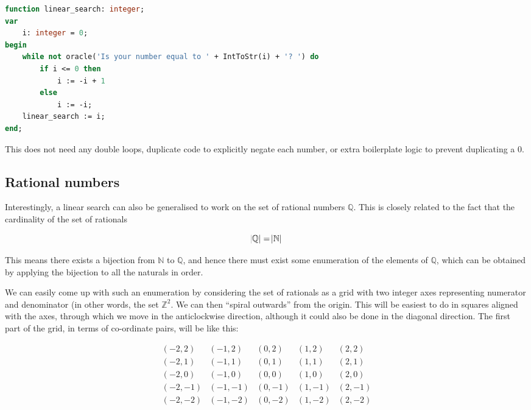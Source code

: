 \documentclass{article}
\begin{document}
\begin{lstlisting}[language=Pascal, caption=Linear search on $\mathbb{Z}$ implementation]
function linear_search: integer;
var
    i: integer = 0;
begin
    while not oracle('Is your number equal to ' + IntToStr(i) + '? ') do
        if i <= 0 then
            i := -i + 1
        else
            i := -i;
    linear_search := i;
end;
\end{lstlisting}

    This does not need any double loops, duplicate code to explicitly negate
    each number, or extra boilerplate logic to prevent duplicating a 0.

    \subsection{Rational numbers}

    Interestingly, a linear search can also be generalised to work on the set
    of rational numbers $\mathbb{Q}$. This is closely related to the fact that
    the cardinality of the set of rationals

    \begin{equation}
    \abs{\mathbb{Q}} = \abs{\mathbb{N}}
    \end{equation}

    This means there exists a bijection from $\mathbb{N}$ to $\mathbb{Q}$, and
    hence there must exist some enumeration of the elements of $\mathbb{Q}$,
    which can be obtained by applying the bijection to all the naturals in
    order.
    
    We can easily come up with such an enumeration by considering the set of
    rationals as a grid with two integer axes representing numerator and
    denominator (in other words, the set $\mathbb{Z}^2$. We can then ``spiral
    outwards'' from the origin. This will be easiest to do in squares aligned
    with the axes, through which we move in the anticlockwise direction,
    although it could also be done in the diagonal direction.  The first part
    of the grid, in terms of co-ordinate pairs, will be like this:

    \begin{equation}
    \begin{matrix}
    (-2, 2) & (-1, 2) & (0, 2) & (1, 2) & (2, 2)\\
    (-2, 1) & (-1, 1) & (0, 1) & (1, 1) & (2, 1)\\
    (-2, 0) & (-1, 0) & (0, 0) & (1, 0) & (2, 0)\\
    (-2, -1) & (-1, -1) & (0, -1) & (1, -1) & (2, -1)\\
    (-2, -2) & (-1, -2) & (0, -2) & (1, -2) & (2, -2)\\
    \end{matrix}
    \end{equation}
\end{document}
